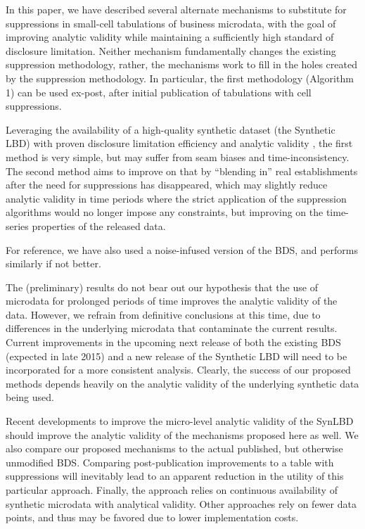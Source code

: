 In this paper, we have described several alternate mechanisms to substitute for suppressions in  small-cell tabulations of business 
microdata, with the goal of improving analytic validity while maintaining a sufficiently high 
standard of disclosure limitation. Neither mechanism fundamentally changes the existing 
suppression methodology, rather, the mechanisms work to fill in the holes created by the 
suppression methodology. In particular, the first methodology (Algorithm 1) can be used 
ex-post, after initial publication of tabulations with cell suppressions. 

Leveraging the availability of a high-quality synthetic dataset
(the Synthetic LBD) with proven disclosure limitation efficiency and analytic validity \cite{KinneyEtAl2011}, the first 
method is very simple, but may suffer from seam biases and time-inconsistency. The second 
method aims to improve on that by ``blending in'' real establishments after the need for suppressions has disappeared, which may slightly 
reduce analytic validity in time periods where the strict application of the suppression 
algorithms would no longer impose any constraints, but improving on the time-series properties 
of the released data. 

For reference, we have also used a noise-infused version of the BDS, and performs similarly if not better. 

The (preliminary) results do not bear out our hypothesis that the use of microdata for 
prolonged periods of time improves the analytic validity of the data. However, we refrain from 
definitive conclusions at this time, due to differences in the underlying microdata that 
contaminate the current results. Current improvements in the upcoming next release of both 
the existing BDS (expected in late 2015) and a new release of the Synthetic LBD will need to be 
incorporated for a more consistent analysis. Clearly, the success of our proposed methods 
depends heavily on the analytic validity of the underlying synthetic data being used.

Recent developments to improve the micro-level analytic validity of the 
\ac{SynLBD} \cite{CES-WP-2014-12} should improve the analytic validity of the mechanisms 
proposed here as well.  We also compare our proposed mechanisms to the actual published, but otherwise unmodified \ac{BDS}. Comparing  post-publication improvements to a table with suppressions \cite{HolanEtAl2010} will inevitably lead to an apparent reduction in the utility of this particular approach. Finally, the approach relies on continuous availability of synthetic microdata with analytical validity. Other approaches rely on fewer data points, and thus may be favored due to lower implementation costs.




